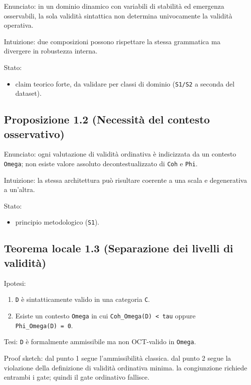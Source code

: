 Enunciato:
in un dominio dinamico con variabili di stabilità ed emergenza osservabili, la sola validità sintattica non determina univocamente la validità operativa.

Intuizione:
due composizioni possono rispettare la stessa grammatica ma divergere in robustezza interna.

Stato:

\begin{itemize}
\tightlist
\item
  claim teorico forte, da validare per classi di dominio (\texttt{S1/S2} a seconda del dataset).
\end{itemize}

\subsection{Proposizione 1.2 (Necessità del contesto osservativo)}

Enunciato:
ogni valutazione di validità ordinativa è indicizzata da un contesto \texttt{Omega}; non esiste valore assoluto decontestualizzato di \texttt{Coh} e \texttt{Phi}.

Intuizione:
la stessa architettura può risultare coerente a una scala e degenerativa a un'altra.

Stato:

\begin{itemize}
\tightlist
\item
  principio metodologico (\texttt{S1}).
\end{itemize}

\subsection{Teorema locale 1.3 (Separazione dei livelli di validità)}

Ipotesi:

\begin{enumerate}
\def\labelenumi{\arabic{enumi}.}
\tightlist
\item
  \texttt{D} è sintatticamente valido in una categoria \texttt{C}.
\item
  Esiste un contesto \texttt{Omega} in cui \texttt{Coh\_Omega(D)\ \textless{}\ tau} oppure \texttt{Phi\_Omega(D)\ =\ 0}.
\end{enumerate}

Tesi:
\texttt{D} è formalmente ammissibile ma non OCT-valido in \texttt{Omega}.

Proof sketch:
dal punto 1 segue l'ammissibilità classica.
dal punto 2 segue la violazione della definizione di validità ordinativa minima.
la congiunzione richiede entrambi i gate; quindi il gate ordinativo fallisce.

